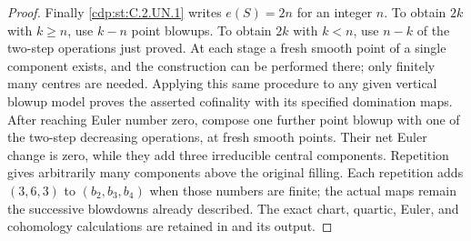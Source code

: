 \begin{proof}
Finally \ref{cdp:st:C.2.UN.1} writes $e(S)=2n$ for an integer $n$. To obtain $2k$
with $k\ge n$, use $k-n$ point blowups. To obtain $2k$ with $k<n$,
use $n-k$ of the two-step operations just proved. At each stage a
fresh smooth point of a single component exists, and the construction
can be performed there; only finitely many centres are needed.
Applying this same procedure to any given vertical blowup model
proves the asserted cofinality with its specified domination maps.
After reaching Euler number zero, compose one further point blowup
with one of the two-step decreasing operations, at fresh smooth
points. Their net Euler change is zero, while they add three
irreducible central components. Repetition gives arbitrarily many
components above the original filling. Each repetition adds
$(3,6,3)$ to $(b_2,b_3,b_4)$ when those numbers are finite; the
actual maps remain the successive blowdowns already described.
The exact chart, quartic, Euler, and cohomology calculations are
retained in  and its output.
\end{proof}



